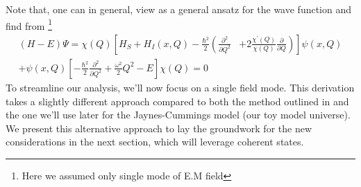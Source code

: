 Note that, one can in general, view  as a general ansatz for the wave function
and find from \footnote{Here we assumed only single mode of E.M field} 
\begin{align}
    \label{eq:class_jcm_eqA}
    (H - E) \Psi = \chi(Q)\left[H_S+H_I(x, Q)-\frac{\hbar^2}{2}\left(\frac{\partial^2}{\partial Q^2}\right.\right.
    & \left.\left. 
    +2 \frac{\chi^{\prime}(Q)}{\chi(Q)} \frac{\partial}{\partial Q}\right)\right] 
    \psi(x, Q) \nonumber \\
    +\psi(x, Q)\left[-\frac{\hbar^2}{2} \frac{\partial^2}{\partial Q^2}+\frac{\omega^2}{2} Q^2
    - E\right] \chi(Q) = 0
\end{align}
To streamline our analysis, we'll now focus on a single field mode. This derivation takes a 
slightly different approach compared to both the method outlined in 
and the one we'll use later for the Jaynes-Cummings model (our toy model universe). 
We present this alternative approach to lay the groundwork for the new considerations 
in the next section, which will leverage coherent states.

